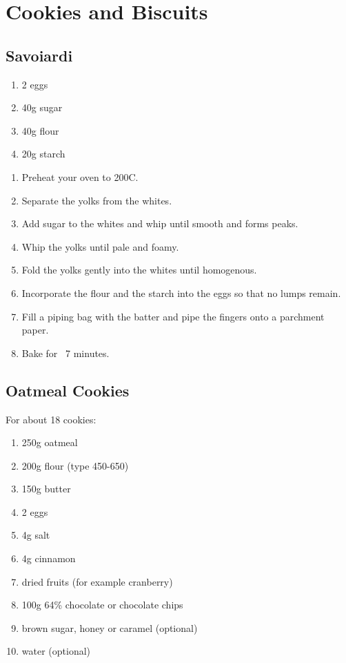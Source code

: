 \chapter{Cookies and Biscuits}

\section{Savoiardi \label{Savoiardi}}
\begin{enumerate}
  \item 2 eggs
  \item 40g sugar
  \item 40g flour
  \item 20g starch
\end{enumerate}

\begin{enumerate}
  \item Preheat your oven to 200C.
  \item Separate the yolks from the whites.
  \item Add sugar to the whites and whip until smooth and forms peaks.
  \item Whip the yolks until pale and foamy.
  \item Fold the yolks gently into the whites until homogenous.
  \item Incorporate the flour and the starch into the eggs so that no lumps
    remain.
  \item Fill a piping bag with the batter and pipe the fingers onto a parchment
    paper.
  \item Bake for ~7 minutes.
\end{enumerate}

\section{Oatmeal Cookies}
For about 18 cookies:
\begin{enumerate}
  \item 250g oatmeal
  \item 200g flour (type 450-650)
  \item 150g butter
  \item 2 eggs
  \item 4g salt
  \item 4g cinnamon
  \item dried fruits (for example cranberry)
  \item 100g 64\% chocolate or chocolate chips
  \item brown sugar, honey or caramel (optional)
  \item water (optional)
\end{enumerate}

